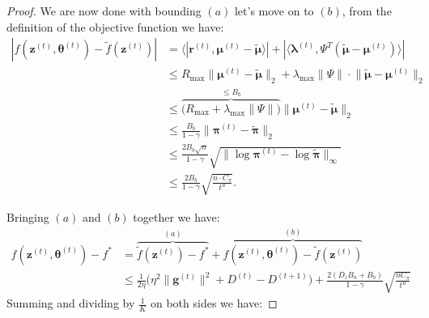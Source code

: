\begin{proof}
We are now done with bounding $(a)$ let's move on to $(b)$, from the definition of the objective function we have:
\begin{align*}
    |f(\bm{z}^{(t)},\bm{\theta}^{(t)}) - \tilde{f}(\bm{z}^{(t)}) |
    &= \big\langle
    |\bm{r}^{(t)},
    \bm{\mu}^{(t)} - \tilde{\bm{\mu}}
    \big\rangle|
    + |\big\langle
    \bm{\lambda}^{(t)}, 
    \Psi^T(\tilde{\bm{\mu}}- \bm{\mu}^{(t)})
    \big\rangle|\\
    &\leq
    R_\text{max}
    \| \bm{\mu}^{(t)} - \tilde{\bm{\mu}} \|_2
    + \lambda_\text{max}
    \big\| \Psi \big\| \cdot 
    \big\| \tilde{\bm{\mu}}- \bm{\mu}^{(t)} \big\|_2\\
    &\leq
    \overbrace{\big(R_\text{max} + \lambda_\text{max}
    \big\| \Psi \big\| \big)}^{\leq B_b}
    \| \bm{\mu}^{(t)} - \tilde{\bm{\mu}} \|_2 \\
    &\leq \frac{B_b}{1-\gamma} \| \bm{\pi}^{(t)} - \tilde{\bm{\pi}} \|_2
    \\
    & \leq
    \frac{2 B_b \sqrt{n}}{1-\gamma}
    \sqrt{\| \log \bm{\pi}^{(t)} - \log \tilde{\bm{\pi}} \|_\infty} \\
    &\leq
    \frac{2 B_b}{1-\gamma}
    \sqrt{\frac{n \cdot C_\pi}{t^{u}}}. 
\end{align*}

Bringing $(a)$ and $(b)$ together we have:
\begin{align*}
    f(\bm{z}^{(t)},\bm{\theta}^{(t)}) - f^* &= 
    \overbrace{\tilde{f}(\bm{z}^{(t)}) - f^* }^{(a)}
    + \overbrace{f(\bm{z}^{(t)},\bm{\theta}^{(t)}) - \tilde{f}(\bm{z}^{(t)})}^{(b)}\\
    &\leq 
    \frac{1}{2\eta} \Big( 
         \eta^2\|\bm{g}^{(t)}\|^2
         + D^{(t)} - D^{(t+1)}
     \Big) 
     + \frac{2(D_z B_a+B_b)}{1 - \gamma} \sqrt{\frac{n C_\pi}{t^u}}
\end{align*}
Summing and dividing by $\frac{1}{K}$ on both sides we have:


\end{proof}
